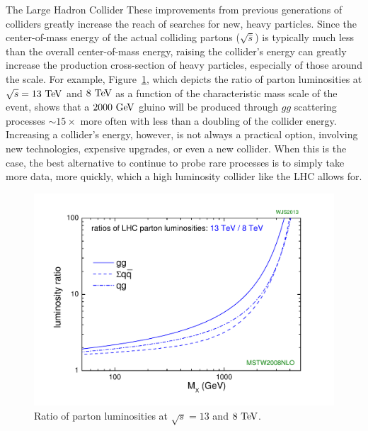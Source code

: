 \begin{section}{The Large Hadron Collider}
These improvements from previous generations of colliders greatly increase the reach of searches for new, heavy particles.
Since the center-of-mass energy of the actual colliding partons ($\sqrt{\hat{s}}$) is typically much less than the overall center-of-mass energy, raising the collider's energy can greatly increase the production cross-section of heavy particles, especially of those around the \TeV scale. 
For example, Figure~\ref{fig:parton_lumi}, which depicts the ratio of parton luminosities at $\sqrt{s} = 13~\mathrm{Te\kern -0.1em V}$ and $8~\mathrm{Te\kern -0.1em V}$ as a function of the characteristic mass scale of the event, shows that a $2000~\mathrm{Ge\kern -0.1em V}$ gluino will be produced through $gg$ scattering processes ${\sim}15\times$ more often with less than a doubling of the collider energy.
Increasing a collider's energy, however, is not always a practical option, involving new technologies, expensive upgrades, or even a new collider. When this is the case, the best alternative to continue to probe rare processes is to simply take more data, more quickly, which a high luminosity collider like the LHC allows for.


\begin{figure}[tbp!]
\begin{center}
\includegraphics[angle=0,width=0.80\columnwidth]{fig/parton_lumi.pdf}
\end{center}
\caption{Ratio of parton luminosities at $\sqrt{s} = 13$ and $8~\mathrm{Te\kern -0.1em V}$.~\cite{parton_lumi}}
\label{fig:parton_lumi}
\end{figure}


\end{section}

